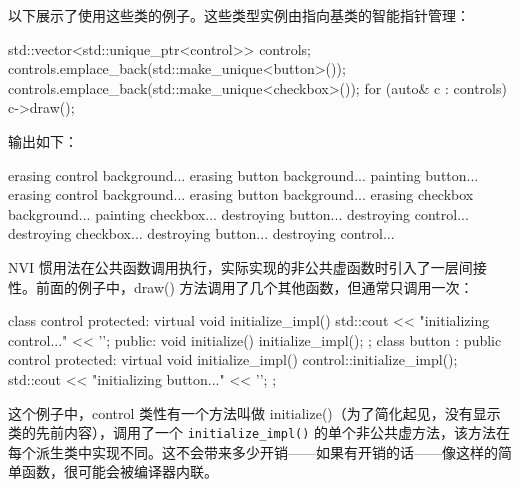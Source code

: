 以下展示了使用这些类的例子。这些类型实例由指向基类的智能指针管理：

\begin{cpp}
std::vector<std::unique_ptr<control>> controls;
controls.emplace_back(std::make_unique<button>());
controls.emplace_back(std::make_unique<checkbox>());
for (auto& c : controls)
    c->draw();
\end{cpp}

输出如下：

\begin{shell}
erasing control background...
erasing button background...
painting button...
erasing control background...
erasing button background...
erasing checkbox background...
painting checkbox...
destroying button...
destroying control...
destroying checkbox...
destroying button...
destroying control...
\end{shell}

NVI 惯用法在公共函数调用执行，实际实现的非公共虚函数时引入了一层间接性。前面的例子中，draw() 方法调用了几个其他函数，但通常只调用一次：

\begin{cpp}
class control
{
protected:
    virtual void initialize_impl()
    {
        std::cout << "initializing control..." << '\n';
    }
public:
    void initialize()
    {
        initialize_impl();
    }
};
class button : public control
{
protected:
    virtual void initialize_impl()
    {
        control::initialize_impl();
        std::cout << "initializing button..." << '\n';
    }
};
\end{cpp}

这个例子中，control 类性有一个方法叫做 initialize()（为了简化起见，没有显示类的先前内容），调用了一个 \verb|initialize_impl()| 的单个非公共虚方法，该方法在每个派生类中实现不同。这不会带来多少开销——如果有开销的话——像这样的简单函数，很可能会被编译器内联。


